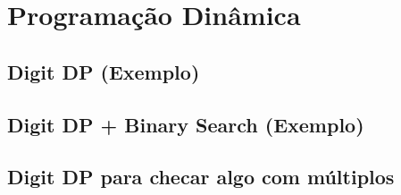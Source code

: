 \section{Programação Dinâmica}

\subsection{Digit DP (Exemplo)}


\subsection{Digit DP + Binary Search (Exemplo)}


\subsection{Digit DP para checar algo com múltiplos}
